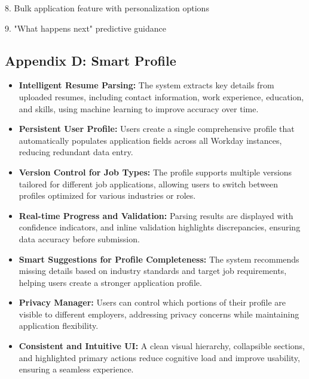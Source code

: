 \documentclass[
	letterpaper, %
]{jdf}
\begin{document}
8. Bulk application feature with personalization options

9. "What happens next" predictive guidance

\hfill \break
\subsection{Appendix D: Smart Profile}
 
\begin{itemize}
    \item \textbf{Intelligent Resume Parsing:} The system extracts key details from uploaded resumes, including contact information, work experience, education, and skills, using machine learning to improve accuracy over time.
    
    \item \textbf{Persistent User Profile:} Users create a single comprehensive profile that automatically populates application fields across all Workday instances, reducing redundant data entry.
    
    \item \textbf{Version Control for Job Types:} The profile supports multiple versions tailored for different job applications, allowing users to switch between profiles optimized for various industries or roles.
    
    \item \textbf{Real-time Progress and Validation:} Parsing results are displayed with confidence indicators, and inline validation highlights discrepancies, ensuring data accuracy before submission.
    
    \item \textbf{Smart Suggestions for Profile Completeness:} The system recommends missing details based on industry standards and target job requirements, helping users create a stronger application profile.
    
    \item \textbf{Privacy Manager:} Users can control which portions of their profile are visible to different employers, addressing privacy concerns while maintaining application flexibility.
    
    \item \textbf{Consistent and Intuitive UI:} A clean visual hierarchy, collapsible sections, and highlighted primary actions reduce cognitive load and improve usability, ensuring a seamless experience.
\end{itemize}

\hfill \break
\end{document}
